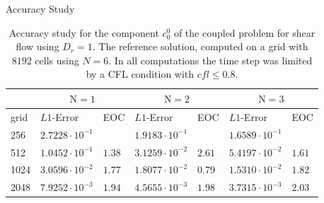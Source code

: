 \begin{frame}{Accuracy Study}
	\scriptsize
	\begin{table}[H]
		\centering
		\begin{tabular}{|l|l|l|l|l|l|l|}
			\hline 
			& \multicolumn{2}{|c|}{$\mathrm{N}=1$} & \multicolumn{2}{|c|}{$\mathrm{N}=2$} & \multicolumn{2}{|c|}{$\mathrm{N}=3$}  \\
			\hline 
			grid & $L1$-Error & EOC  & $L1$-Error & EOC  & $L1$-Error & EOC\\
			\hline
			256  & $  2.7228  \cdot 10^{-1}$ & & $ 1.9183 \cdot 10^{-1}$&&$1.6589 \cdot 10^{-1}$& \\
			\hline
			512 & $1.0452 \cdot 10^{-1}$ &$1.38$ & $ 3.1259 \cdot 10^{-2}$&$2.61$& $ 5.4197 \cdot 10^{-2}$&$1.61$\\
			\hline 
			1024  &$3.0596 \cdot 10^{-2}$&$1.77$& $1.8077 \cdot 10^{-2}$&$0.79$ & $1.5310\cdot 10^{-2}$&$1.82$\\
			\hline
			2048 & $ 7.9252\cdot 10^{-3}$ &$1.94$& $ 4.5655\cdot 10^{-3}$&$1.98$& $3.7315  \cdot 10^{-3}$&$2.03$\\
			\hline
		\end{tabular}
		\caption{Accuracy study for the component $c^0_0$ of the coupled problem for shear flow using $D_r=1$. The reference solution, computed on a grid with $8192$ cells using $N=6$. In all computations the time step was limited by a CFL condition with $cfl \leq 0.8$.}
		\label{tab:Dr=1_error_N=1,2,3vsN=6}
	\end{table}
\end{frame}


